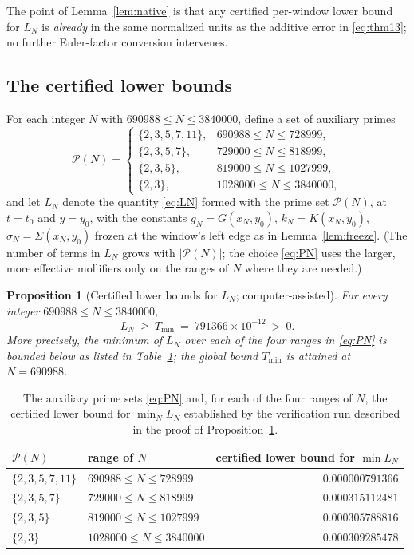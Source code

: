 \documentclass[11pt]{article}
\newtheorem{proposition}[theorem]{Proposition}
\theoremstyle{definition}
\newcommand{\calP}{\mathcal{P}}
\begin{document}
The point of Lemma~\ref{lem:native} is that any certified
per-window lower bound for $L_N$ is \emph{already} in the same
normalized units as the additive error in \eqref{eq:thm13}; no
further Euler-factor conversion intervenes.

\subsection{The certified lower bounds}\label{sec:stored}

For each integer $N$ with $690988\le N\le 3840000$, define a set of
auxiliary primes
\begin{equation}\label{eq:PN}
\calP(N)=
\begin{cases}
\{2,3,5,7,11\}, & 690988\le N\le728999,\\
\{2,3,5,7\}, & 729000\le N\le818999,\\
\{2,3,5\}, & 819000\le N\le1027999,\\
\{2,3\}, & 1028000\le N\le3840000,
\end{cases}
\end{equation}
and let $L_N$ denote the quantity \eqref{eq:LN} formed with the
prime set $\calP(N)$, at $t=t_0$ and $y=y_0$, with the constants
$g_N=G(x_N,y_0)$, $k_N=K(x_N,y_0)$, $\sigma_N=\Sigma(x_N,y_0)$
frozen at the window's left edge as in Lemma~\ref{lem:freeze}. (The
number of terms in $L_N$ grows with $|\calP(N)|$; the choice
\eqref{eq:PN} uses the larger, more effective mollifiers only on the
ranges of $N$ where they are needed.)

\begin{proposition}[Certified lower bounds for $L_N$;
computer-assisted]\label{prop:sweep}
For every integer $690988\le N\le3840000$,
\[
L_N\ \ge\ T_{\min}\ =\ 791366\times10^{-12}\ >\ 0 .
\]
More precisely, the minimum of $L_N$ over each of the four ranges in
\eqref{eq:PN} is bounded below as listed in
Table~\ref{tab:primesets}; the global bound $T_{\min}$ is attained
at $N=690988$.
\end{proposition}

\begin{table}[ht!]
\centering
\begin{tabular}{@{}llr@{}}
\toprule
$\calP(N)$ & range of $N$ & certified lower bound for $\min L_N$\\
\midrule
$\{2,3,5,7,11\}$ & $690988\le N\le728999$ & $0.000000791366$\\
$\{2,3,5,7\}$    & $729000\le N\le818999$ & $0.000315112481$\\
$\{2,3,5\}$      & $819000\le N\le1027999$ & $0.000305788816$\\
$\{2,3\}$        & $1028000\le N\le3840000$ & $0.000309285478$\\
\bottomrule
\end{tabular}
\caption{The auxiliary prime sets \eqref{eq:PN} and, for each of the
four ranges of $N$, the certified lower bound for $\min_N L_N$
established by the verification run described in the proof of
Proposition~\ref{prop:sweep}.}
\label{tab:primesets}
\end{table}
\end{document}
